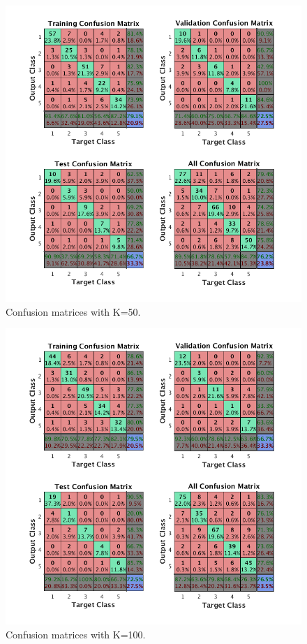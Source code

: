 \documentclass{article}
\begin{document}
\begin{figure}[h]
\centering
\includegraphics[scale=0.5]{Figures/Metrics/conf_k50}
\caption{Confusion matrices with K=50.}
\label{fig:k50}
\end{figure}
\begin{figure}[h]
\centering
\includegraphics[scale=0.5]{Figures/Metrics/conf_k100_n20}
\caption{Confusion matrices with K=100.}
\label{fig:k100}
\end{figure}
\end{document}
